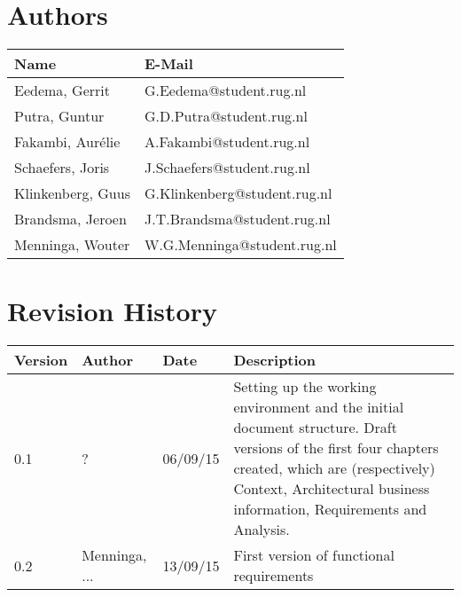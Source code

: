 \section*{Authors}

\begin{tabular}{ l l }
    \textbf{Name} & \textbf{E-Mail} \\ \hline
	Eedema, Gerrit & G.Eedema@student.rug.nl\\
	Putra, Guntur & G.D.Putra@student.rug.nl\\
	Fakambi, Aurélie & A.Fakambi@student.rug.nl\\
	Schaefers, Joris & J.Schaefers@student.rug.nl\\
	Klinkenberg, Guus & G.Klinkenberg@student.rug.nl\\
	Brandsma, Jeroen & J.T.Brandsma@student.rug.nl\\
	Menninga, Wouter & W.G.Menninga@student.rug.nl\\ \hline
\end{tabular}

\section*{Revision History}
\begin{tabular}{p{} p{} p{} p{}}
    \textbf{Version} & \textbf{Author} &  \textbf{Date} & \textbf{Description}\\ \hline
    0.1 & ? & 06/09/15 & Setting up the working environment and the initial document structure. Draft versions of the first four chapters created, which are (respectively) Context, Architectural business information, Requirements and Analysis. \\
    \hline
    
    0.2 & Menninga, ... & 13/09/15 & First version of functional requirements \\
    \hline
    
\end{tabular}